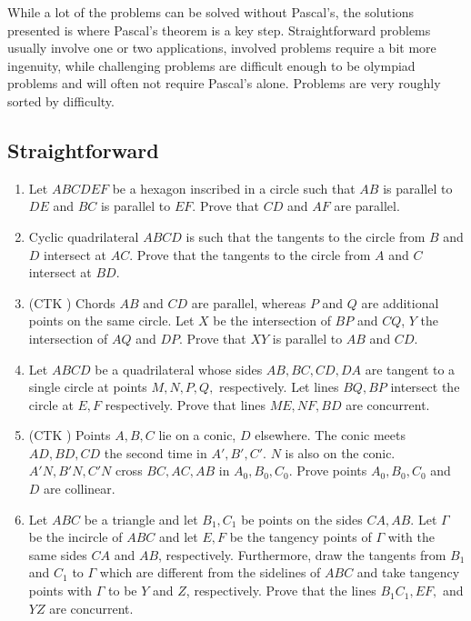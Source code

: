 \documentclass[11pt,paper=letter]{scrartcl}
\begin{document}
While a lot of the problems can be solved without Pascal's, the solutions presented is where Pascal's theorem is a key step. Straightforward problems usually involve one or two applications, involved problems require a bit more ingenuity, while challenging problems are difficult enough to be olympiad problems and will often not require Pascal's alone. Problems are very roughly sorted by difficulty.

\subsection{Straightforward}

\begin{enumerate}

\item Let $ABCDEF$ be a hexagon inscribed in a circle such that $AB$ is parallel to $DE$ and $BC$ is parallel to $EF$. Prove that $CD$ and $AF$ are parallel.

\item Cyclic quadrilateral $ABCD$ is such that the tangents to the circle from $B$ and $D$ intersect at $AC$. Prove that the tangents to the circle from $A$ and $C$ intersect at $BD$.

\item (CTK \cite{CTK4}) Chords $AB$ and $CD$ are parallel, whereas $P$ and $Q$ are additional points on the same circle. Let $X$ be the intersection of $BP$ and $CQ$, $Y$ the intersection of $AQ$ and $DP$. Prove that $XY$ is parallel to $AB$ and $CD$.

\item Let $ABCD$ be a quadrilateral whose sides $AB, BC, CD, DA$ are tangent to a single circle at points $M, N, P, Q,$ respectively. Let lines $BQ, BP$ intersect the circle at $E, F$ respectively. Prove that lines $ME, NF, BD$ are concurrent.

\item (CTK \cite{CTK8}) Points $A,B,C$ lie on a conic, $D$ elsewhere. The conic meets $AD, BD, CD$ the second time in $A', B', C'$. $N$ is also on the conic. $A'N, B'N, C'N$ cross $BC, AC, AB$ in $A_0, B_0, C_0$. Prove points $A_0, B_0, C_0$ and $D$ are collinear.

\item Let $ABC$ be a triangle and let $B_1, C_1$ be points on the sides $CA, AB$. Let $\Gamma$ be the incircle of $ABC$ and let $E, F$ be the tangency points of $\Gamma$ with the same sides $CA$ and $AB$, respectively. Furthermore, draw the tangents from $B_1$ and $C_1$ to $\Gamma$ which are different from the sidelines of $ABC$ and take tangency points with $\Gamma$ to be $Y$ and $Z$, respectively. Prove that the lines $B_1C_1, EF,$ and $YZ$ are concurrent.

\end{enumerate}
\end{document}
